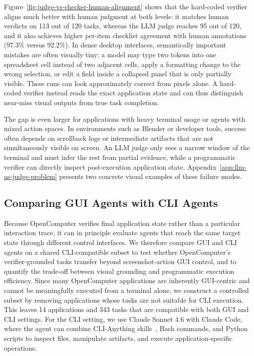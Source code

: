 \documentclass{llmxive}
\providecommand{\ours}{OpenComputer\xspace}
\begin{document}
Figure~\ref{fig:judge-vs-checker-human-alignment}
shows that the hard-coded verifier aligns much better with human judgment at
both levels: it matches human verdicts on 113 out of 120 tasks, whereas the LLM
judge reaches 95 out of 120, and it also achieves higher per-item checklist
agreement with human annotations (97.3\% versus 92.2\%).
In dense
desktop interfaces, semantically important mistakes are often visually tiny: a
model may type two tokens into one spreadsheet cell instead of two adjacent
cells, apply a formatting change to the wrong selection, or edit a field inside a collapsed panel that is only partially visible. These runs can look approximately correct from pixels alone. A hard-coded verifier instead reads the exact application state and can thus distinguish near-miss visual outputs from true task completion.

The gap is even larger for applications with heavy terminal usage or agents with mixed action spaces. In environments such as Blender or developer tools, success often depends on scrollback logs or intermediate artifacts that are not simultaneously visible on screen. An LLM judge only sees a narrow window of
the terminal and must infer the rest from partial evidence, while a programmatic verifier can directly inspect post-execution application state. Appendix~\ref{app:llm-as-judge-problem} presents two concrete visual examples of these failure modes.




\subsection{Comparing GUI Agents with CLI Agents}
Because \ours verifies final application state rather than a particular interaction trace, it can in principle evaluate agents that reach the same target state through different control interfaces. We therefore compare GUI and CLI agents on a shared CLI-compatible subset to test whether \ours’s verifier-grounded tasks transfer beyond screenshot-action GUI control, and to quantify the trade-off between visual grounding and programmatic execution efficiency.
Since many OpenComputer applications are inherently GUI-centric and cannot be meaningfully executed from a terminal alone, we
construct a controlled subset by removing applications whose tasks are not
suitable for CLI execution. This leaves 14 applications and 343 tasks that are
compatible with both GUI and CLI settings. For the CLI setting, we use Claude
Sonnet 4.6 with Claude Code, where the agent can combine CLI-Anything skills~\citep{hkuds2026clianything},
Bash commands, and Python scripts to inspect files, manipulate artifacts, and
execute application-specific operations.
\end{document}
